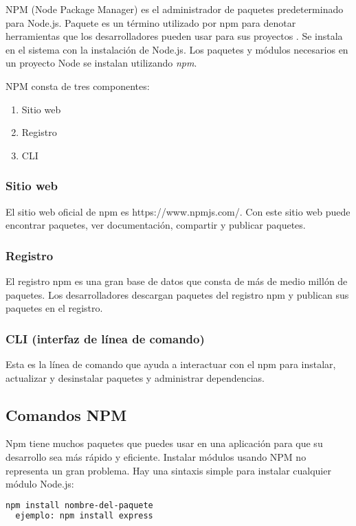 NPM (Node Package Manager) es el administrador de paquetes predeterminado para Node.js. Paquete es un término utilizado por npm para denotar herramientas que los desarrolladores pueden usar para sus proyectos \cite{goalkicker-node}. Se instala en el sistema con la instalación de Node.js. Los paquetes y módulos necesarios en un proyecto Node se instalan utilizando \textit{npm}.
\vspace{0.8cm}

NPM consta de tres componentes:
\begin{enumerate}
  \item Sitio web
  \item Registro
  \item CLI
\end{enumerate}
\subsubsection{Sitio web}
El sitio web oficial de npm es https://www.npmjs.com/. Con este sitio web puede encontrar paquetes, ver documentación, compartir y publicar paquetes.
\subsubsection{Registro}
El registro npm es una gran base de datos que consta de más de medio millón de paquetes. Los desarrolladores descargan paquetes del registro npm y publican sus paquetes en el registro.
\subsubsection{CLI (interfaz de línea de comando)}
Esta es la línea de comando que ayuda a interactuar con el npm para instalar, actualizar y desinstalar paquetes y administrar dependencias.
\subsection{Comandos NPM}
Npm tiene muchos paquetes que puedes usar en una aplicación para que su desarrollo sea más rápido y eficiente. Instalar módulos usando NPM no representa un gran problema. Hay una sintaxis simple para instalar cualquier módulo Node.js:
\vspace{0.8cm}

\begin{lstlisting}[language=HTML]
  npm install nombre-del-paquete
  ejemplo: npm install express
\end{lstlisting}
% 